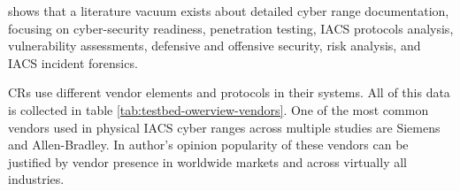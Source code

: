 \citeauthor{17-SCADA-testbed} \parencite{17-SCADA-testbed} shows that a literature vacuum exists about detailed cyber range documentation, focusing on cyber-security readiness, penetration testing, IACS protocols analysis, vulnerability assessments, defensive and offensive security, risk analysis, and IACS incident forensics.

CRs use different vendor elements and protocols in their systems. All of this data is collected in table \ref{tab:testbed-owerview-vendors}. One of the most common vendors used in physical IACS cyber ranges across multiple studies are Siemens and Allen-Bradley.  In author's opinion popularity of these vendors can be justified by vendor presence in worldwide markets and across virtually all industries.

